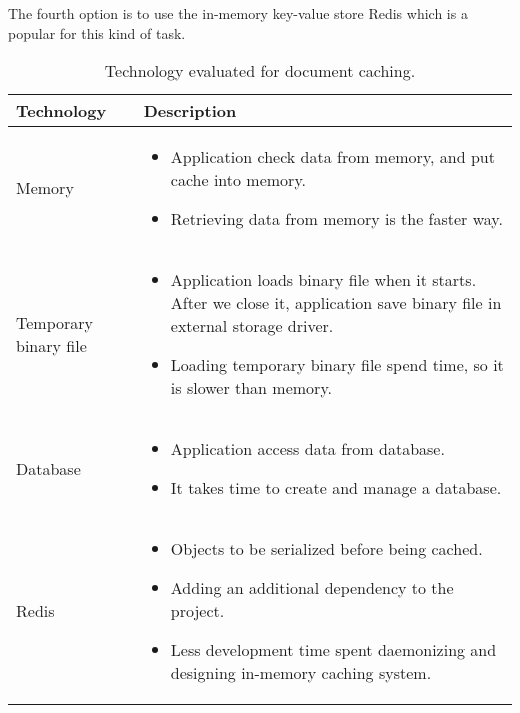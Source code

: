 The fourth option is to use the in-memory key-value store Redis \cite{redis} which is a popular for this kind of task.

\begin{table}[H]
  \begin{center}
      \begin{tabular}{ | l | p{10cm} |}
      \hline
      Technology & Description  \\ \hline

      Memory &
      \begin{itemize}
        \item Application check data from memory, and put cache into memory.
        \item Retrieving data from memory is the faster way.
      \end{itemize} \\ \hline

      Temporary binary file &
      \begin{itemize}
        \item Application loads binary file when it starts. After we close it, application save binary file in external storage driver.
        \item Loading temporary binary file spend time, so it is slower than memory.
      \end{itemize} \\ \hline

      Database &
      \begin{itemize}
        \item Application access data from database.
        \item It takes time to create and manage a database.
      \end{itemize} \\ \hline

      Redis &
      \begin{itemize}
        \item Objects to be serialized before being cached.
        \item Adding an additional dependency to the project.
        \item Less development time spent daemonizing and designing in-memory caching system.
      \end{itemize} \\ \hline
      \end{tabular}
  \end{center}
  \caption{Technology evaluated for document caching.}
\end{table}

